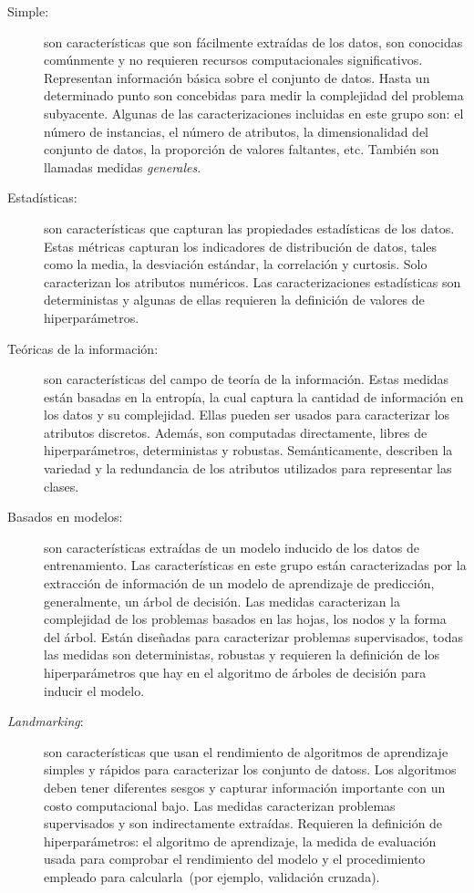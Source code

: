 \begin{description}
	\item[Simple:] son características que son fácilmente extraídas de los
    datos, son conocidas comúnmente y no requieren recursos computacionales
    significativos. Representan información básica sobre el conjunto de datos.
    Hasta un determinado punto son concebidas para medir la complejidad del
    problema subyacente. Algunas de las caracterizaciones incluidas en este
    grupo son: el número de instancias, el número de atributos, la
    dimensionalidad del conjunto de datos, la proporción de valores faltantes,
    etc. También son llamadas medidas \textit{generales}.
	
	\item[Estadísticas:] son características que capturan las propiedades
    estadísticas de los datos. Estas métricas capturan los indicadores de
    distribución de datos, tales como la media, la desviación estándar,
    la correlación y curtosis. Solo caracterizan los atributos numéricos. Las
    caracterizaciones estadísticas son deterministas y algunas de ellas
    requieren la definición de valores de hiperparámetros.
	
	\item[Teóricas de la información:] son características del campo de teoría
    de la información. Estas medidas están basadas en la entropía, la cual
    captura la cantidad de información en los datos y su complejidad. Ellas
    pueden ser usados para caracterizar los atributos discretos. Además, son
    computadas directamente, libres de hiperparámetros, deterministas y
    robustas. Semánticamente, describen la variedad y la redundancia de los
    atributos utilizados para representar las clases.
	
	\item[Basados en modelos:] son características extraídas de un modelo
    inducido de los datos de entrenamiento. Las características en este grupo
    están caracterizadas por la extracción de información de un modelo de
    aprendizaje de predicción, generalmente, un árbol de decisión. Las medidas
    caracterizan la complejidad de los problemas basados en las hojas, los
    nodos y la forma del árbol. Están diseñadas para caracterizar problemas
    supervisados, todas las medidas son deterministas, robustas y requieren la
    definición de los hiperparámetros que hay en el algoritmo de árboles de
    decisión para inducir el modelo.
	
	\item[\textit{Landmarking}:] son características que usan el rendimiento de
    algoritmos de aprendizaje simples y rápidos para caracterizar los conjunto
    de datoss. Los algoritmos deben tener diferentes sesgos y capturar
    información importante con un costo computacional bajo. Las medidas
    caracterizan problemas supervisados y son indirectamente extraídas.
    Requieren la definición de hiperparámetros: el algoritmo de aprendizaje,
    la medida de evaluación usada para comprobar el rendimiento del modelo y
    el procedimiento empleado para calcularla~(por ejemplo, validación cruzada).
\end{description}

